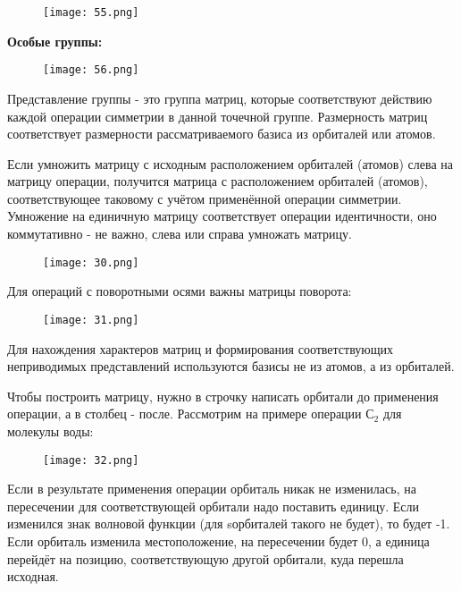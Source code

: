 \begin{figure}[H]
	\centering
	{\texttt{[image: 55.png]}}
\end{figure}

\begin{center}
	\textbf{Особые группы:}
\end{center}


\begin{figure}[H]
	\centering
	{\texttt{[image: 56.png]}}
\end{figure}

	Представление группы - это группа матриц, которые соответствуют
	действию каждой операции симметрии в данной точечной группе.
	Размерность матриц соответствует размерности рассматриваемого
	базиса из орбиталей или атомов.
	
	\par\smallskip
	
	
	Если умножить матрицу с исходным расположением орбиталей
	(атомов) слева на матрицу операции, получится матрица с
	расположением орбиталей (атомов), соответствующее таковому с
	учётом применённой операции симметрии. Умножение на
	единичную матрицу соответствует операции идентичности, оно
	коммутативно - не важно, слева или справа умножать матрицу.
	
	\begin{figure}[H]
		\centering
		{\texttt{[image: 30.png]}}
	\end{figure}
	
	Для операций с поворотными осями важны матрицы поворота:
	
	\begin{figure}[H]
		\centering
		{\texttt{[image: 31.png]}}
	\end{figure}
	
	
	Для нахождения характеров матриц и формирования
	соответствующих неприводимых представлений используются
	базисы не из атомов, а из орбиталей.
	
	\par\smallskip
	
	Чтобы построить матрицу, нужно в строчку написать орбитали до
	применения операции, а в столбец - после. Рассмотрим на примере
	операции $С_2$ для молекулы воды:
	
		\begin{figure}[H]
		\centering
		{\texttt{[image: 32.png]}}
	\end{figure}
	

	Если в результате применения операции орбиталь никак не
	изменилась, на пересечении для соответствующей орбитали надо
	поставить единицу. Если изменился знак волновой функции (для sорбиталей такого не будет), то будет -1. Если орбиталь изменила
	местоположение, на пересечении будет 0, а единица перейдёт на
	позицию, соответствующую другой орбитали, куда перешла
	исходная.
	
